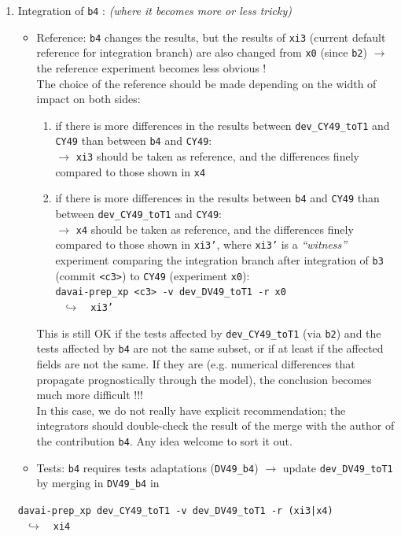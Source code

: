\documentclass[a4paper,10pt,twoside]{article}
\begin{document}
\begin{appendix}
\begin{enumerate}[label=(\arabic*)]
 \item Integration of \texttt{b4} : \textit{(where it becomes more or less tricky)}
 \begin{itemize}
  \item Reference: \texttt{b4} changes the results, but the results of \texttt{xi3} (current default reference for integration branch) are also changed from \texttt{x0} (since \texttt{b2}) $\rightarrow$ the reference experiment becomes less obvious !\\
  The choice of the reference should be made depending on the width of impact on both sides:
  \begin{enumerate}[label=\alph*)]
   \item if there is more differences in the results between \texttt{dev\_CY49\_toT1} and \texttt{CY49} than between \texttt{b4} and \texttt{CY49}:\\
   $\rightarrow$ \texttt{xi3} should be taken as reference, and the differences finely compared to those shown in \texttt{x4}
   \item if there is more differences in the results between \texttt{b4} and \texttt{CY49} than between \texttt{dev\_CY49\_toT1} and \texttt{CY49}:\\
   $\rightarrow$ \texttt{x4} should be taken as reference, and the differences finely compared to those shown in \texttt{xi3'}, where \texttt{xi3'} is a \textit{``witness''} experiment comparing the integration branch after integration of \texttt{b3} (commit \texttt{<c3>}) to \texttt{CY49} (experiment \texttt{x0}):\\
   \texttt{davai-prep\_xp <c3> -v dev\_DV49\_toT1 -r x0}\\
   $~~~\hookrightarrow~~~$ \texttt{xi3'}
  \end{enumerate}
  This is still OK if the tests affected by \texttt{dev\_CY49\_toT1} (via \texttt{b2}) and the tests affected by \texttt{b4} are not the same subset, or if at least if the affected fields are not the same. If they are (e.g. numerical differences that propagate prognostically through the model), the conclusion becomes much more difficult !!!\\
  In this case, we do not really have explicit recommendation; the integrators should double-check the result of the merge with the author of the contribution \texttt{b4}. Any idea welcome to sort it out.
  \item Tests: \texttt{b4} requires tests adaptations (\texttt{DV49\_b4}) $\rightarrow$ update \texttt{dev\_DV49\_toT1} by merging in \texttt{DV49\_b4} in
 \end{itemize}
 \texttt{davai-prep\_xp dev\_CY49\_toT1 -v dev\_DV49\_toT1 -r (xi3|x4)}\\
   $~~~\hookrightarrow~~~$ \texttt{xi4}
\end{enumerate}


\end{appendix}
\end{document}

